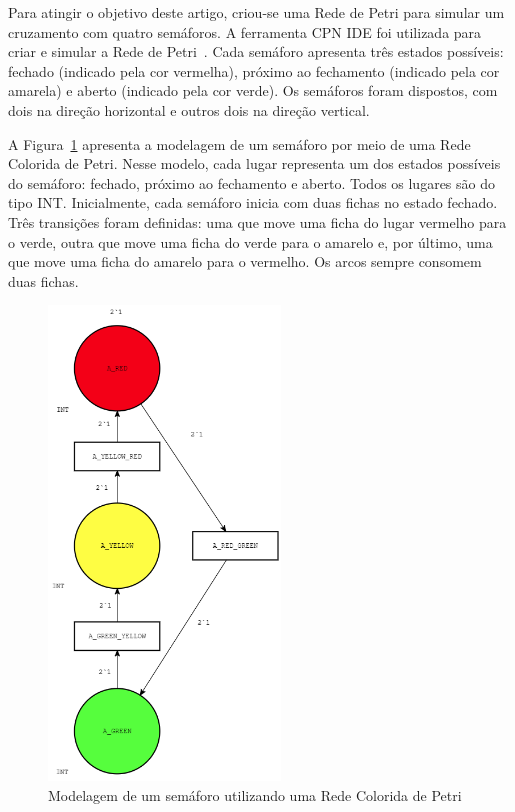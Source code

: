 Para atingir o objetivo deste artigo, criou-se uma Rede de Petri para simular um cruzamento com quatro semáforos.
A ferramenta CPN IDE foi utilizada para criar e simular a Rede de Petri~\cite{cpn-ide}.
Cada semáforo apresenta três estados possíveis: fechado (indicado pela cor vermelha), próximo ao fechamento (indicado pela cor amarela) e aberto (indicado pela cor verde).
Os semáforos foram dispostos, com dois na direção horizontal e outros dois na direção vertical.

A Figura~\ref{fig:traffic_light} apresenta a modelagem de um semáforo por meio de uma Rede Colorida de Petri.
Nesse modelo, cada lugar representa um dos estados possíveis do semáforo: fechado, próximo ao fechamento e aberto.
Todos os lugares são do tipo INT\@.
Inicialmente, cada semáforo inicia com duas fichas no estado fechado.
Três transições foram definidas: uma que move uma ficha do lugar vermelho para o verde, outra que move uma ficha do verde para o amarelo e, por último, uma que move uma ficha do amarelo para o vermelho.
Os arcos sempre consomem duas fichas.

\clearpage

\begin{figure}[ht]
	\centering
	\includegraphics[width=0.55\textwidth]{images/traffic_light.png}
	\caption{Modelagem de um semáforo utilizando uma Rede Colorida de Petri}
    \label{fig:traffic_light}
\end{figure}

